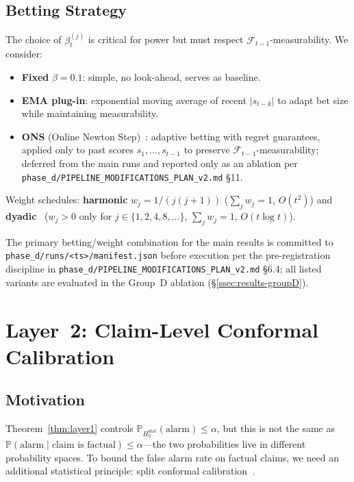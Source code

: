\documentclass[runningheads]{llncs}
\newcommand{\Hnull}{H_0^{\text{stat}}}
\begin{document}
\subsection{Betting Strategy}

The choice of $\beta_t^{(j)}$ is critical for power but must respect
$\mathcal{F}_{t-1}$-measurability. We consider:
\begin{itemize}
    \item \textbf{Fixed} $\beta = 0.1$: simple, no look-ahead, serves as baseline.
    \item \textbf{EMA plug-in}: exponential moving average of recent
          $|s_{t-k}|$ to adapt bet size while maintaining measurability.
    \item \textbf{ONS} (Online Newton Step)~\cite{hazan2007logarithmic}:
          adaptive betting with regret guarantees, applied only to past scores
          $s_1, \ldots, s_{t-1}$ to preserve $\mathcal{F}_{t-1}$-measurability;
          deferred from the main runs and reported only as an ablation per
          \texttt{phase\_d/PIPELINE\_MODIFICATIONS\_PLAN\_v2.md} §11.
\end{itemize}
Weight schedules: \textbf{harmonic}
$w_j = 1/(j(j+1))$ ($\sum_j w_j = 1$, $O(t^2)$) and
\textbf{dyadic}~\cite{shin2023edetectors}
($w_j > 0$ only for $j \in \{1, 2, 4, 8, \ldots\}$,
$\sum_j w_j = 1$, $O(t \log t)$).

The primary betting/weight combination for the main results is committed
to \texttt{phase\_d/runs/<ts>/manifest.json} before execution per the
pre-registration discipline in
\texttt{phase\_d/PIPELINE\_MODIFICATIONS\_PLAN\_v2.md} §6.4; all listed
variants are evaluated in the Group~D ablation
(\S\ref{ssec:results-groupD}).

\section{Layer~2: Claim-Level Conformal Calibration}

\subsection{Motivation}

Theorem~\ref{thm:layer1} controls
$\mathbb{P}_{\Hnull}(\text{alarm}) \le \alpha$, but this is not the same as
$\mathbb{P}(\text{alarm} \mid \text{claim is factual}) \le \alpha$---the two
probabilities live in different probability spaces. To bound the false alarm
rate on factual claims, we need an additional statistical principle:
split conformal calibration~\cite{vovk2005algorithmic,lei2018distribution}.
\end{document}
